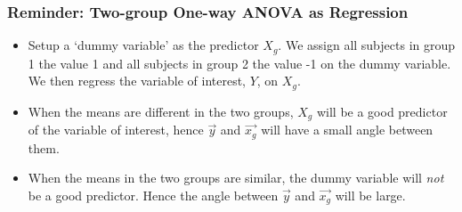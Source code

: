 \documentclass{beamer}
\begin{document}
\begin{frame}
  \frametitle{Reminder: Two-group One-way ANOVA as Regression}

\begin{itemize}

\item Setup a `dummy variable' as the predictor $X_g$.   We assign all subjects in group 1 the value 1 and all subjects in group 2 the value -1 on the dummy variable.  We then regress the variable of interest, $Y$, on $X_g$.

\item When the means are different in the two groups, $X_g$ will be a good predictor of the variable of interest, hence $\vec{y}$ and $\vec{x_g}$ will have a small angle between them.

\item When the means in the two groups are similar, the dummy variable will \emph{not} be a good predictor.  Hence the angle between $\vec{y}$ and $\vec{x_g}$ will be large.

\end{itemize}

\begin{center}


\end{center}

\end{frame}
\end{document}
